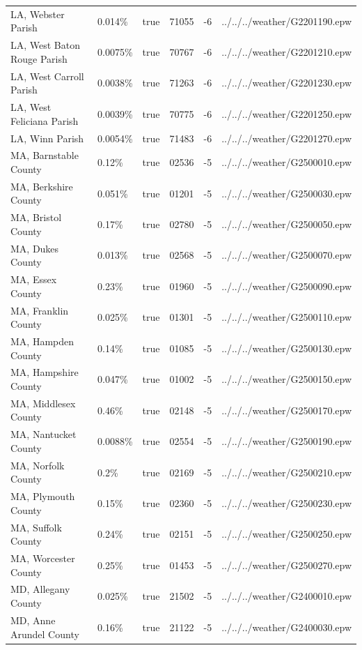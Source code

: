 \begin{longtable}[]{@{}llllll@{}}
LA, Webster Parish & 0.014\% & true & 71055 & -6 &
../../../weather/G2201190.epw \\
LA, West Baton Rouge Parish & 0.0075\% & true & 70767 & -6 &
../../../weather/G2201210.epw \\
LA, West Carroll Parish & 0.0038\% & true & 71263 & -6 &
../../../weather/G2201230.epw \\
LA, West Feliciana Parish & 0.0039\% & true & 70775 & -6 &
../../../weather/G2201250.epw \\
LA, Winn Parish & 0.0054\% & true & 71483 & -6 &
../../../weather/G2201270.epw \\
MA, Barnstable County & 0.12\% & true & 02536 & -5 &
../../../weather/G2500010.epw \\
MA, Berkshire County & 0.051\% & true & 01201 & -5 &
../../../weather/G2500030.epw \\
MA, Bristol County & 0.17\% & true & 02780 & -5 &
../../../weather/G2500050.epw \\
MA, Dukes County & 0.013\% & true & 02568 & -5 &
../../../weather/G2500070.epw \\
MA, Essex County & 0.23\% & true & 01960 & -5 &
../../../weather/G2500090.epw \\
MA, Franklin County & 0.025\% & true & 01301 & -5 &
../../../weather/G2500110.epw \\
MA, Hampden County & 0.14\% & true & 01085 & -5 &
../../../weather/G2500130.epw \\
MA, Hampshire County & 0.047\% & true & 01002 & -5 &
../../../weather/G2500150.epw \\
MA, Middlesex County & 0.46\% & true & 02148 & -5 &
../../../weather/G2500170.epw \\
MA, Nantucket County & 0.0088\% & true & 02554 & -5 &
../../../weather/G2500190.epw \\
MA, Norfolk County & 0.2\% & true & 02169 & -5 &
../../../weather/G2500210.epw \\
MA, Plymouth County & 0.15\% & true & 02360 & -5 &
../../../weather/G2500230.epw \\
MA, Suffolk County & 0.24\% & true & 02151 & -5 &
../../../weather/G2500250.epw \\
MA, Worcester County & 0.25\% & true & 01453 & -5 &
../../../weather/G2500270.epw \\
MD, Allegany County & 0.025\% & true & 21502 & -5 &
../../../weather/G2400010.epw \\
MD, Anne Arundel County & 0.16\% & true & 21122 & -5 &
../../../weather/G2400030.epw \\

\end{longtable}
